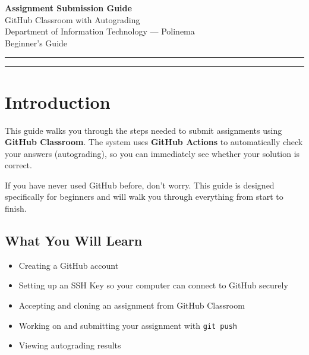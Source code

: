 \documentclass[
    a4paper,
    11pt,
    parskip=half
]{scrartcl}
\begin{document}
\begin{center}
    {\LARGE\bfseries Assignment Submission Guide}\\[0.4em]
    {\large GitHub Classroom with Autograding}\\[0.3em]
    {\normalsize Department of Information Technology --- Polinema}\\[0.2em]
    {\small\color{gray} Beginner's Guide}
\end{center}

\vspace{0.5em}
\hrule
\vspace{1em}

\tableofcontents

\vspace{1em}
\hrule
\vspace{1em}

\section{Introduction}

This guide walks you through the steps needed to submit assignments using \textbf{GitHub Classroom}. The system uses \textbf{GitHub Actions} to automatically check your answers (autograding), so you can immediately see whether your solution is correct.

\begin{notebox}
If you have never used GitHub before, don't worry. This guide is designed specifically for beginners and will walk you through everything from start to finish.
\end{notebox}

\subsection{What You Will Learn}

\begin{itemize}
    \item Creating a GitHub account
    \item Setting up an SSH Key so your computer can connect to GitHub securely
    \item Accepting and cloning an assignment from GitHub Classroom
    \item Working on and submitting your assignment with \texttt{git push}
    \item Viewing autograding results
\end{itemize}
\end{document}
